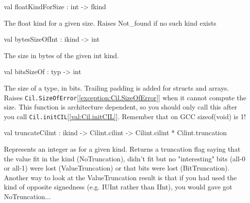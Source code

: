 \documentclass[11pt]{article}
\begin{document}
\label{val:Cil.floatKindForSize}\begin{ocamldoccode}
val floatKindForSize : int -> fkind
\end{ocamldoccode}
\begin{ocamldocdescription}
The float kind for a given size. Raises Not\_found
  if no such kind exists


\end{ocamldocdescription}




\label{val:Cil.bytesSizeOfInt}\begin{ocamldoccode}
val bytesSizeOfInt : ikind -> int
\end{ocamldoccode}
\begin{ocamldocdescription}
The size in bytes of the given int kind.


\end{ocamldocdescription}




\label{val:Cil.bitsSizeOf}\begin{ocamldoccode}
val bitsSizeOf : typ -> int
\end{ocamldoccode}
\begin{ocamldocdescription}
The size of a type, in bits. Trailing padding is added for structs and 
 arrays. Raises {\tt{Cil.SizeOfError}}[\ref{exception:Cil.SizeOfError}] when it cannot compute the size. This 
 function is architecture dependent, so you should only call this after you 
 call {\tt{Cil.initCIL}}[\ref{val:Cil.initCIL}]. Remember that on GCC sizeof(void) is 1!


\end{ocamldocdescription}




\label{val:Cil.truncateCilint}\begin{ocamldoccode}
val truncateCilint :
  ikind -> Cilint.cilint -> Cilint.cilint * Cilint.truncation
\end{ocamldoccode}
\begin{ocamldocdescription}
Represents an integer as for a given kind.  Returns a truncation
 flag saying that the value fit in the kind (NoTruncation), didn't
 fit but no "interesting" bits (all-0 or all-1) were lost
 (ValueTruncation) or that bits were lost (BitTruncation). Another 
 way to look at the ValueTruncation result is that if you had used
 the kind of opposite signedness (e.g. IUInt rather than IInt), you
 would gave got NoTruncation$\ldots$


\end{ocamldocdescription}
\end{document}
